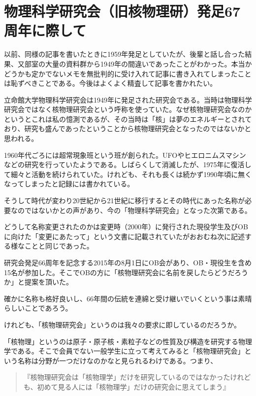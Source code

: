 \documentclass[10pt,b5paper,papersize]{jsbook}
\begin{document}
\chapter*{物理科学研究会（旧核物理研）発足67周年に際して}
以前、同様の記事を書いたときに1959年発足としていたが、後輩と話し合った結果、又部室の大量の資料群から1949年の間違いであったことがわかった。本当かどうかも定かでないメモを無批判的に受け入れて記事に書き入れてしまったことは恥ずべきことである。今後はよくよく精査して記事を書かれたい。\par
立命館大学物理科学研究会は1949年に発足された研究会である。当時は物理科学研究会ではなく核物理研究会という呼称を使っていた。なぜ核物理研究会なのかというとこれは私の憶測であるが、その当時は「核」は夢のエネルギーとされており、研究も盛んであったということから核物理研究会となったのではないかと思われる。\par
1960年代ごろには超常現象班という班が創られた。UFOやヒエロニムスマシンなどの研究を行っていたようである。しばらくして消滅したが、1975年に復活して細々と活動を続けられていた。けれども、それも長くは続かず1990年頃に無くなってしまったと記録には書かれている。\par
そうして時代が変わり20世紀から21世紀に移行するとその時代にあった名称が必要なのではないかとの声があり、今の「物理科学研究会」となった次第である。\par
どうして名称変更されたのかは変更時（2000年）に発行された現役学生及びOBに向けた「変更にあたって」という文書に記載されていたがおおむね次に記述する様なことと同じであった。\par
研究会発足66周年を記念する2015年の8月1日にOB会があり、OB・現役生を含め15名が参加した。そこでOBの方に「核物理研究会に名前を戻したらどうだろうか」と提案を頂いた。\par
確かに名称も格好良いし、66年間の伝統を連綿と受け継いでいくという事は素晴らしいことであろう。\par
けれども、「核物理研究会」というのは我々の要求に即しているのだろうか。\par
「核物理」というのは原子・原子核・素粒子などの性質及び構造を研究する物理学である。そこで会員でない一般学生に立って考えてみると「核物理研究会」という名称は分野が一つだけなのかなと見られるわけである。つまり、\par
\begin{quote}
『核物理研究会は「核物理学」だけを研究しているのではなかったけれども、初めて見る人には「核物理学」だけの研究会に思えてしまう』
\end{quote}
\end{document}
